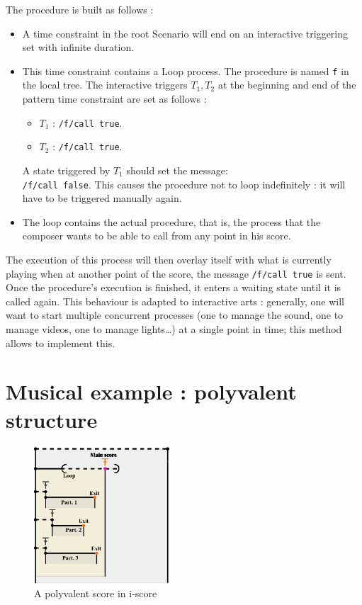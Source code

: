 \documentclass{article}
\begin{document}
The procedure is built as follows : 
\begin{itemize}
    \item A time constraint in the root Scenario will end on an interactive triggering set with infinite duration.
    \item This time constraint contains a Loop process. 
    The procedure is named \lstinline{f} in the local tree. The interactive triggers $T_1, T_2$ at the beginning and end of the pattern time constraint are set as follows : 
    \begin{itemize}
        \item $T_1$ : \lstinline{/f/call true}.
        \item $T_2$ : \lstinline{/f/call true}.
    \end{itemize}
    A state triggered by $T_1$ should set the message:~\\
    \lstinline{/f/call false}. 
    This causes the procedure not to loop 
    indefinitely : it will have to be triggered manually again.
    \item The loop contains the actual procedure, that is, the process that the composer wants to be able to call from any point in his score. 
\end{itemize}

The execution of this process will then overlay itself with what is currently playing when at another point of the score, 
the message \lstinline{/f/call true} is sent.
Once the procedure's execution is finished, it enters a waiting state until it is called again.
This behaviour is adapted to interactive arts : generally, one will want to start multiple 
concurrent processes (one to manage the sound, one to manage videos, one to manage lights\dots) at a single point in time; this method allows to implement this.

\section{Musical example : polyvalent structure}
\begin{figure}
    \centering
    \includegraphics[width=0.45\textwidth]{images/partition.eps}
    \caption{A polyvalent score in i-score}
    \label{fig.polyvalent}
\end{figure}
\end{document}
